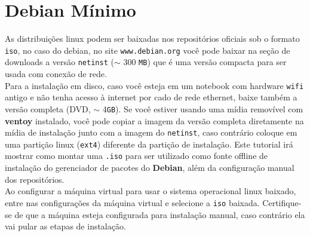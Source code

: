 \documentclass[12pt,a4paper]{article}
\begin{document}
\section{Debian Mínimo} 

\hspace{\baselineskip}

As distribuições linux podem ser baixadas nos repositórios oficiais sob o formato \texttt{iso}, no caso do debian, no site \texttt{www.debian.org} você pode baixar na seção de downloads a versão \texttt{netinst} ($\sim$ 300 \texttt{MB}) que é uma versão compacta para ser usada com conexão de rede.\\

Para a instalação em disco, caso você esteja em um notebook com hardware \texttt{wifi} antigo e não tenha acesso à internet por cado de rede ethernet, baixe também a versão completa (DVD, $\sim$ 4\texttt{GB}). Se você estiver usando uma mídia removível com \textbf{ventoy} instalado, você pode copiar a imagem da versão completa diretamente na mídia de instalação junto com a imagem do \texttt{netinst}, caso contrário coloque em uma partição linux (\texttt{ext4}) diferente da partição de instalação. Este tutorial irá mostrar como montar uma \texttt{.iso} para ser utilizado como fonte offline de instalação do gerenciador de pacotes do \textbf{Debian}, além da configuração manual dos repositórios. \\

Ao configurar a máquina virtual para usar o sistema operacional linux baixado, entre nas configurações da máquina virtual e selecione a \texttt{iso} baixada. Certifique-se de que a máquina esteja configurada para instalação manual, caso contrário ela vai pular as etapas de instalação. \\
\end{document}
